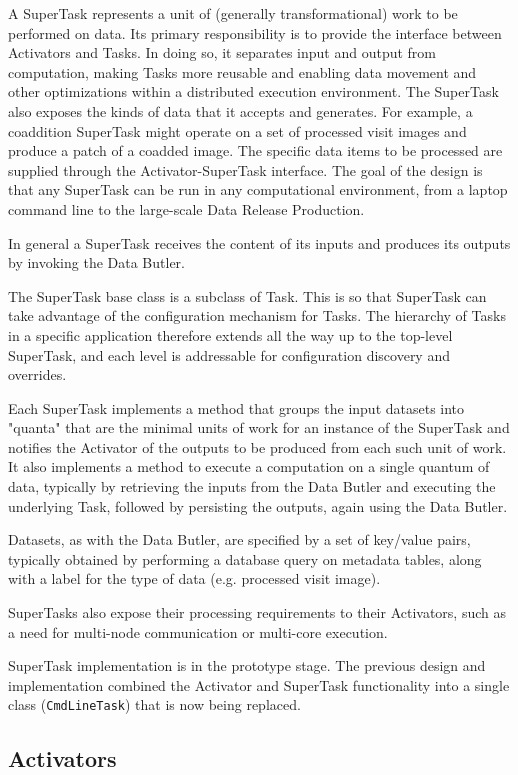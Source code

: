 \documentclass[DM,lsstdraft,toc]{lsstdoc}
\begin{document}
A SuperTask represents a unit of (generally transformational) work to be
performed on data.  Its primary responsibility is to provide the interface
between Activators and Tasks.  In doing so, it separates input and output from
computation, making Tasks more reusable and enabling data movement and other
optimizations within a distributed execution environment.  The SuperTask also
exposes the kinds of data that it accepts and generates.  For example, a
coaddition SuperTask might operate on a set of processed visit images and
produce a patch of a coadded image.  The specific data items to be processed
are supplied through the Activator-SuperTask interface.  The goal of the
design is that any SuperTask can be run in any computational environment,
from a laptop command line to the large-scale Data Release Production.

In general a SuperTask receives the content of its inputs and produces its
outputs by invoking the Data Butler.

The SuperTask base class is a subclass of Task. This is so that SuperTask can
take advantage of the configuration mechanism for Tasks. The hierarchy of Tasks
in a specific application therefore extends all the way up to the top-level
SuperTask, and each level is addressable for configuration discovery and
overrides.

Each SuperTask implements a method that groups the input datasets into "quanta"
that are the minimal units of work for an instance of the SuperTask and
notifies the Activator of the outputs to be produced from each such unit of
work.  It also implements a method to execute a computation on a single quantum
of data, typically by retrieving the inputs from the Data Butler and executing
the underlying Task, followed by persisting the outputs, again using the Data
Butler.

Datasets, as with the Data Butler, are specified by a set of key/value pairs,
typically obtained by performing a database query on metadata tables, along
with a label for the type of data (e.g. processed visit image).

SuperTasks also expose their processing requirements to their Activators, such
as a need for multi-node communication or multi-core execution.

SuperTask implementation is in the prototype stage.  The previous design and
implementation combined the Activator and SuperTask functionality into a single
class (\texttt{CmdLineTask}) that is now being replaced.

\subsection{Activators}\label{activators}
\end{document}
